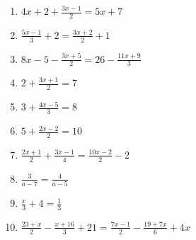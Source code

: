\documentclass{article}
\begin{document}
\begin{enumerate}
\item {\Large $4x+2+\frac{3x-1}{2}=5x+7$}
\item {\Large $\frac{5x-1}{3}+2=\frac{3x+2}{2}+1$}
\item {\Large $8x-5-\frac{3x+5}{2}=26-\frac{11x+9}{3}$}
\item {\Large $2+\frac{3x+1}{2}=7$}
\item {\Large $3+\frac{4x-5}{3}=8$}
\item {\Large $5+\frac{2x-2}{2}=10$}
\item {\Large $\frac{2x+1}{2}+\frac{3x-1}{4}=\frac{10x-2}{2}-2$}
\item {\Large $\frac{3}{a-7}=\frac{4}{a-5}$}
\item {\Large $\frac{x}{3}+4=\frac{1}{3}$}
\item {\Large $\frac{23+x}{2}-\frac{x+16}{3}+21=\frac{7x-1}{2}-\frac{19+7x}{6}+4x$}
\end{enumerate}

\newpage
\end{document}

